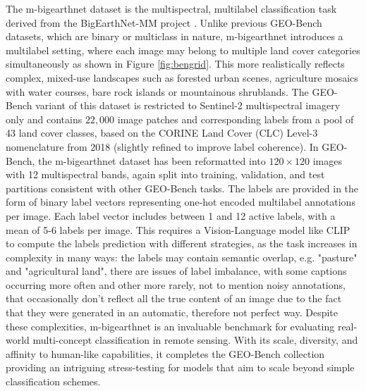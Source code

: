 \documentclass[a4paper, oneside, english]{sapthesis} %
\begin{document}
The m-bigearthnet dataset is the multispectral, multilabel classification task derived from the BigEarthNet-MM project \cite{sumbul2021bigearthnet}. Unlike previous GEO-Bench datasets, which are binary or multiclass in nature, m-bigearthnet introduces a multilabel setting, where each image may belong to multiple land cover categories simultaneously as shown in Figure \ref{fig:bengrid}. This more realistically reflects complex, mixed-use landscapes such as forested urban scenes, agriculture mosaics with water courses, bare rock islands or mountainous shrublands.
The GEO-Bench variant of this dataset is restricted to Sentinel-2 multispectral imagery only and contains $22,000$ image patches and corresponding labels from a pool of 43 land cover classes, based on the CORINE Land Cover (CLC) Level-3 nomenclature from 2018 (slightly refined to improve label coherence). In GEO-Bench, the m-bigearthnet dataset has been reformatted into $120\times 120$ images with 12 multispectral bands, again split into training, validation, and test partitions consistent with other GEO-Bench tasks. The labels are provided in the form of binary label vectors representing one-hot encoded multilabel annotations per image. Each label vector includes between 1 and 12 active labels, with a mean of 5-6 labels per image. This requires a Vision-Language model like CLIP to compute the labels prediction with different strategies, as the task increases in complexity in many ways: the labels may contain semantic overlap, e.g. "pasture" and "agricultural land", there are issues of label imbalance, with some captions occurring more often and other more rarely, not to mention noisy annotations, that occasionally don't reflect all the true content of an image due to the fact that they were generated in an automatic, therefore not perfect way. Despite these complexities, m-bigearthnet is an invaluable benchmark for evaluating real-world multi-concept classification in remote sensing. With its scale, diversity, and affinity to human-like capabilities, it completes the GEO-Bench collection providing an intriguing stress-testing for models that aim to scale beyond simple classification schemes.
\end{document}
